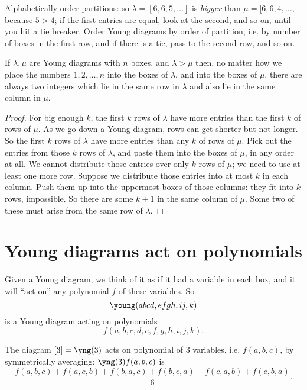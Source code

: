 Alphabetically order partitions: so \(\lambda=[6,6,5,\dots]\) is \emph{bigger} than \(\mu=[6,6,4,\dots\), because \(5 > 4\); if the first entries are equal, look at the second, and so on, until you hit a tie breaker.
Order Young diagrams by order of partition, i.e. by number of boxes in the first row, and if there is a tie, pass to the second row, and so on.

\begin{lemma}\label{lemma:scramble}
If \(\lambda,\mu\) are Young diagrams with \(n\) boxes, and \(\lambda > \mu\) then, no matter how we place the numbers \(1,2,\dots,n\) into the boxes of \(\lambda\), and into the boxes of \(\mu\), there are always two integers which lie in the same row in \(\lambda\) and also lie in the same column in \(\mu\).
\end{lemma}
\begin{proof}
For big enough \(k\), the first \(k\) rows of \(\lambda\) have more entries than the first \(k\) of rows of \(\mu\).
As we go down a Young diagram, rows can get shorter but not longer.
So the first \(k\) rows of \(\lambda\) have more entries than any \(k\) of rows of \(\mu\).
Pick out the entries from those \(k\) rows of \(\lambda\), and paste them into the boxes of \(\mu\), in any order at all.
We cannot distribute those entries over only \(k\) rows of \(\mu\); we need to use at least one more row.
Suppose we distribute those entries into at most \(k\) in each column.
Push them up into the uppermost boxes of those columns: they fit into \(k\) rows, impossible.
So there are some \(k+1\) in the same column of \(\mu\).
Some two of these must arise from the same row of \(\lambda\).
\end{proof}


\section{Young diagrams act on polynomials}
Given a Young diagram, we think of it as if it had a variable in each box, and it will ``act on'' any polynomial \(f\) of these variables.
So
\[
\young(abcd,efgh,ij,k)
\]
is a Young diagram acting on polynomials
\[
f(a,b,c,d,e,f,g,h,i,j,k).
\] 

\begin{example}
The diagram \([3]=\yng(3)\) acts on polynomial of 3 variables, i.e. \(f(a,b,c)\), by symmetrically averaging: \(\yng(3) f(a,b,c)\) is
\[
\frac{f(a,b,c)+f(a,c,b)+f(b,a,c)+f(b,c,a)+f(c,a,b)+f(c,b,a)}{6}.
\]
\end{example}


